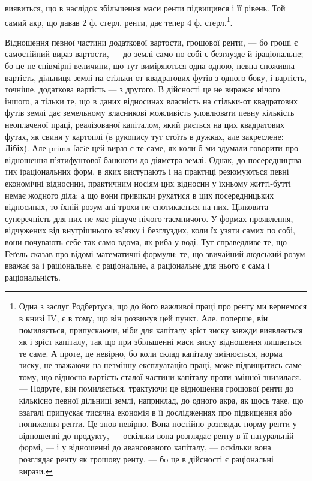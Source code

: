 \parcont{}  %
виявиться, що в наслідок збільшення маси ренти підвищився і її рівень. Той
самий акр, що давав 2 ф. стерл. ренти, дає тепер 4 ф. стерл.\footnote{
Одна з заслуг Родбертуса, що до його важливої праці про ренту ми вернемося в книзі IV,
є в тому, що він розвинув цей пункт. Але, поперше, він помиляється, припускаючи, ніби для капіталу
зріст зиску завжди виявляється як і зріст капіталу, так що при збільшенні маси зиску відношення
лишається
те саме. А проте, це невірно, бо коли склад капіталу змінюється, норма зиску, не зважаючи на
незмінну експлуатацію праці, може підвищитись саме тому, що відносна вартість сталої частини
капіталу
проти змінної знизилася. — Подруге, він помиляється, трактуючи це відношення грошової ренти до
кількісно певної дільниці землі, наприклад, до одного акра, як щось таке, що взагалі припускає
тисячна
економія в її дослідженнях про підвищення або пониження ренти. Це знов невірно. Вона постійно
розглядає норму ренти у відношенні до продукту, — оскільки вона розглядає ренту в її натуральній
формі, — і у відношенні до авансованого капіталу, — оскільки вона розглядає ренту як грошову ренту,
—
бo це в дійсності є раціональні вирази.
}.

Відношення певної частини додаткової вартости, грошової ренти, — бо гроші
є самостійний вираз вартости, — до землі само по собі є безглузде й іраціональне;
бо це не співмірні величини, що тут виміряються одна одною, певна
споживна вартість, дільниця землі на стільки-от квадратових футів з одного
боку, і вартість, точніше, додаткова вартість — з другого. В дійсності це не виражає
нічого іншого, а тільки те, що в даних відносинах власність на стільки-от квадратових
футів землі дає земельному власникові можливість уловлювати певну кількість
неоплаченої праці, реалізованої капіталом, який риється на цих квадратових футах,
як свиня у картоплі (в рукопису тут стоїть в дужках, але закреслене: Лібіх). Але
prima fасiе цей вираз є те саме, як коли б ми здумали говорити про відношення
п’ятифунтової банкноти до діяметра землі. Однак, до посередництва тих іраціональних
форм, в яких виступають і на практиці резюмуються певні економічні
відносини, практичним носіям цих відносин у їхньому житті-бутті немає
жодного діла; а що вони привикли рухатися в цих посередницьких відносинах,
то їхній розум ані трохи не спотикається на них. Цілковита суперечність для них
не має рішуче нічого таємничого. У формах проявлення, відчужених від внутрішнього
зв’язку і безглуздих, коли їх узяти самих по собі, вони почувають себе
так само вдома, як риба у воді. Тут справедливе те, що Геґель сказав про
відомі математичні формули: те, що звичайний людський розум вважає за
і раціональне, є раціональне, а раціональне для нього є сама і раціональність.

